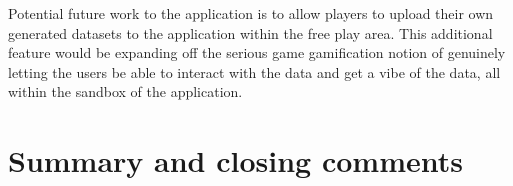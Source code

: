 		Potential future work to the application is to allow players to upload their own generated datasets to the application within the free play area. This additional feature would be expanding off the serious game gamification notion of genuinely letting the users be able to interact with the data and get a vibe of the data, all within the sandbox of the application. 




	
	
	
	
	
		
	



	\section{Summary and closing comments}